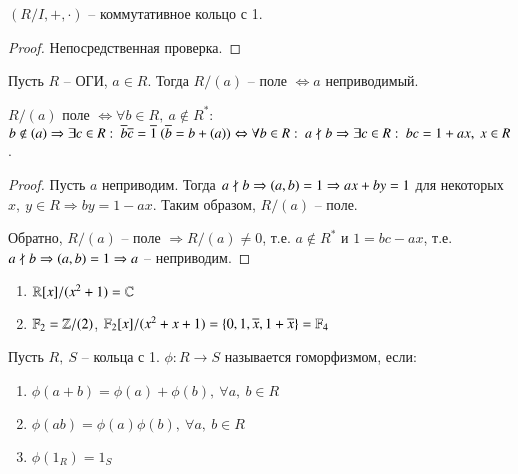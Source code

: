 \documentclass[main]{subfiles}
\begin{document}
\begin{proposition}
    $(R/I, +, \cdot)$ -- коммутативное кольцо с 1.
\end{proposition}

\begin{proof}
    Непосредственная проверка.
\end{proof}

\begin{theorem}
    Пусть $R$ -- ОГИ, $a \in R$. Тогда $R/(a)$ -- поле 
    $\Leftrightarrow a$ неприводимый.
\end{theorem}

\begin{remark}
    $R/(a)$ поле $\Leftrightarrow \forall b \in R, \ a \not\in R^*$: $b \not\in (a) \Rightarrow
    \exists c \in R: \ \overline{b}\overline{c} = \overline{1} \ (\overline{b} = b + (a)) \Leftrightarrow
    \forall b \in R: \ a \not\mid b \Rightarrow \exists c \in R: \ bc = 1 + ax, \ x \in R$. 
\end{remark}

\begin{proof}
    Пусть $a$ неприводим. Тогда 
    $a \not\mid b \Rightarrow (a, b) = 1 \Rightarrow ax + by = 1$ для некоторых $x, \ y \in R \Rightarrow by = 1 - ax$.
    Таким образом, $R/(a)$ -- поле. 

    Обратно,  $R/(a)$ -- поле $\Rightarrow R/(a) \neq 0$, т.е. $a \not\in R^*$ и $1 = bc - ax$, т.е. 
    $a \not\mid b \Rightarrow (a, b) = 1 \Rightarrow a$ -- неприводим.
\end{proof}

\begin{example}
    \begin{enumerate}
        \item $\mathbb{R}[x]/(x^2+1) = \mathbb{C}$
        \item $\mathbb{F}_2 = \mathbb{Z}/(2)$, $\mathbb{F}_2[x]/(x^2+x+1) = \{0, 1, \overline{x}, 1 + \overline{x}\}  = \mathbb{F}_4$
    \end{enumerate}
\end{example}

\begin{definition} [Гомоморфизм]
    Пусть $R, \ S$ -- кольца с 1. $\phi: R \rightarrow S$ называется гоморфизмом, если: 
    \begin{enumerate}
        \item $\phi(a+b) = \phi(a) + \phi(b), \ \forall a, \ b \in R$
        \item $\phi(ab) = \phi(a)\phi(b), \ \forall a, \ b \in R$
        \item $\phi(1_R) = 1_S$
    \end{enumerate}
\end{definition}
\end{document}
